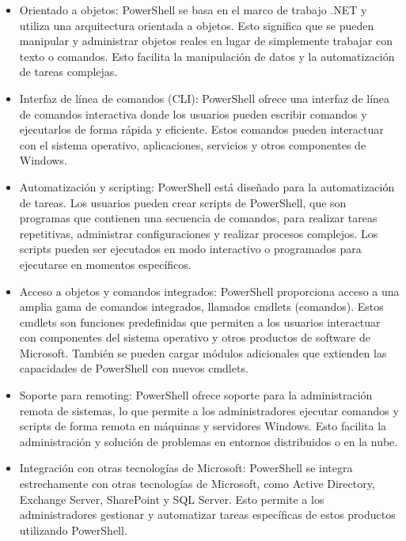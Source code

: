 \documentclass[a4paper, 12pt]{book}
\begin{document}
\begin{itemize}

\item Orientado a objetos: PowerShell se basa en el marco de trabajo .NET y utiliza una arquitectura orientada a objetos. Esto significa que se pueden manipular y administrar objetos reales en lugar de simplemente trabajar con texto o comandos. Esto facilita la manipulación de datos y la automatización de tareas complejas.

\item Interfaz de línea de comandos (CLI): PowerShell ofrece una interfaz de línea de comandos interactiva donde los usuarios pueden escribir comandos y ejecutarlos de forma rápida y eficiente. Estos comandos pueden interactuar con el sistema operativo, aplicaciones, servicios y otros componentes de Windows.

\item Automatización y scripting: PowerShell está diseñado para la automatización de tareas. Los usuarios pueden crear scripts de PowerShell, que son programas que contienen una secuencia de comandos, para realizar tareas repetitivas, administrar configuraciones y realizar procesos complejos. Los scripts pueden ser ejecutados en modo interactivo o programados para ejecutarse en momentos específicos.

\item Acceso a objetos y comandos integrados: PowerShell proporciona acceso a una amplia gama de comandos integrados, llamados cmdlets (comandos). Estos cmdlets son funciones predefinidas que permiten a los usuarios interactuar con componentes del sistema operativo y otros productos de software de Microsoft. También se pueden cargar módulos adicionales que extienden las capacidades de PowerShell con nuevos cmdlets.

\item Soporte para remoting: PowerShell ofrece soporte para la administración remota de sistemas, lo que permite a los administradores ejecutar comandos y scripts de forma remota en máquinas y servidores Windows. Esto facilita la administración y solución de problemas en entornos distribuidos o en la nube.

\item Integración con otras tecnologías de Microsoft: PowerShell se integra estrechamente con otras tecnologías de Microsoft, como Active Directory, Exchange Server, SharePoint y SQL Server. Esto permite a los administradores gestionar y automatizar tareas específicas de estos productos utilizando PowerShell.
\end{itemize}
\end{document}
